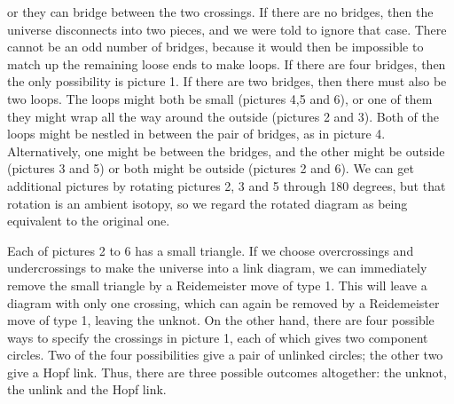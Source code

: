 \documentclass[a4paper]{amsart}
\begin{document}
\begin{solution}
 or they can bridge between the two crossings.  If there are no
 bridges, then the universe disconnects into two pieces, and we were
 told to ignore that case.  There cannot be an odd number of bridges,
 because it would then be impossible to match up the remaining loose
 ends to make loops.  If there are four bridges, then the only
 possibility is picture 1.  If there are two bridges, then there must
 also be two loops.  The loops might both be small (pictures 4,5 and
 6), or one of them they might wrap all the way around the outside
 (pictures 2 and 3).  Both of the loops might be nestled in
 between the pair of bridges, as in picture 4.  Alternatively, one
 might be between the bridges, and the other might be outside
 (pictures 3 and 5) or both might be outside (pictures 2 and 6).  We
 can get additional pictures by rotating pictures 2, 3 and 5 through
 180 degrees, but that rotation is an ambient isotopy, so we regard
 the rotated diagram as being equivalent to the original one.

 Each of pictures 2 to 6 has a small triangle.  If we choose
 overcrossings and undercrossings to make the universe into a link
 diagram, we can immediately remove the small triangle by a
 Reidemeister move of type 1.  This will leave a diagram with only one
 crossing, which can again be removed by a Reidemeister move of type
 1, leaving the unknot.  On the other hand, there are four possible
 ways to specify the crossings in picture 1, each of which gives two
 component circles.  Two of the four possibilities give a pair of
 unlinked circles; the other two give a Hopf link.  Thus, there are
 three possible outcomes altogether: the unknot, the unlink and the
 Hopf link.
\end{solution}
\end{document}
